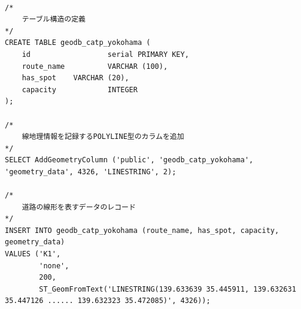 \begin{lstlisting}[caption = 路線データを表すクエリーの例, label = program1]

/*
    テーブル構造の定義
*/
CREATE TABLE geodb_catp_yokohama (
    id                  serial PRIMARY KEY,
    route_name          VARCHAR (100),
    has_spot    VARCHAR (20),
    capacity            INTEGER
);

/*
    線地理情報を記録するPOLYLINE型のカラムを追加
*/
SELECT AddGeometryColumn ('public', 'geodb_catp_yokohama', 'geometry_data', 4326, 'LINESTRING', 2);

/*
    道路の線形を表すデータのレコード
*/
INSERT INTO geodb_catp_yokohama (route_name, has_spot, capacity, geometry_data)
VALUES ('K1',
        'none',
        200,
        ST_GeomFromText('LINESTRING(139.633639 35.445911, 139.632631 35.447126 ...... 139.632323 35.472085)', 4326));
\end{lstlisting}

